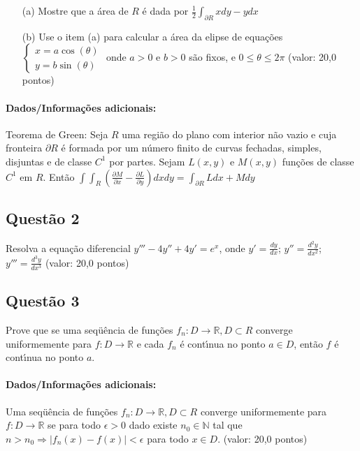 \documentclass{report}
\begin{document}
\begin{enumerate}

\item[(a)] Mostre que a \'area de $R$ \'e dada por $\displaystyle \frac1{2} \int_{\partial R} x dy - y dx$

\item[(b)] Use o item (a) para calcular a \'area da elipse de equa\c c\~oes $\begin{cases} x=a\cos(\theta) \\ y=b\sin(\theta)\end{cases}$ onde $a > 0$ e $b > 0$ s\~ao fixos, e $0 \leq \theta \leq 2 \pi$ (valor: 20,0 pontos)

\end{enumerate}

\paragraph{Dados/Informa\c c\~oes adicionais:} Teorema de Green: Seja $R$ uma regi\~ao do plano com interior n\~ao vazio e cuja fronteira $\partial R$ \'e formada por um n\'umero finito de curvas fechadas, simples, disjuntas e de classe $C^1$ por partes. Sejam $L(x,y)$ e $M(x,y)$ fun\c c\~oes de classe $C^1$ em $R$. Ent\~ao $\displaystyle \int\!\int_R \left(\frac{\partial M}{\partial x}-\frac{\partial L}{\partial y}\right)dx dy=\int_{\partial R} L dx + M dy$

\subsection{\color{blue} Quest\~ao 2}

Resolva a equa\c c\~ao diferencial $y'''- 4y'' + 4y' = e^x$, onde $y'=\displaystyle\frac{dy}{dx}$; $y''=\displaystyle\frac{d^2 y}{dx^2}$; $y'''=\displaystyle\frac{d^3 y}{dx^3}$ (valor: 20,0 pontos)

\subsection{\color{blue} Quest\~ao 3}

Prove que se uma seqü\^encia de fun\c c\~oes $f_n: D \to \mathbb R, D \subset R$ converge uniformemente para $f: D \to \mathbb R$ e cada $f_n$ \'e cont\'\i nua no ponto $a \in D$, ent\~ao $f$ \'e cont\'\i nua no ponto $a$.

\paragraph{Dados/Informa\c c\~oes adicionais:} Uma seqü\^encia de fun\c c\~oes $f_n: D \to \mathbb R, D \subset R$ converge uniformemente para $f: D \to \mathbb R$ se para todo $\epsilon > 0$ dado existe $n_0 \in \mathbb N$ tal que $n > n_0 \Longrightarrow |f_n(x) - f(x)| < \epsilon$ para todo $x \in D$. (valor: 20,0 pontos)
\end{document}
